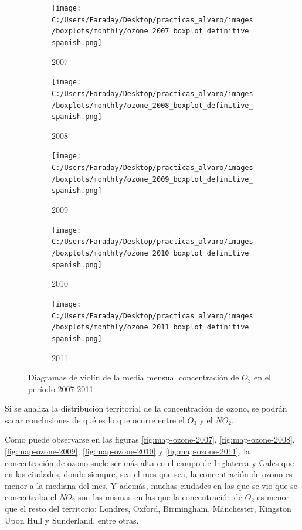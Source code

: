 \documentclass[12pt]{article}
\begin{document}
\begin{figure}[H]
\centering
\begin{subfigure}[H]{0.45\textwidth}
\texttt{[image: C:/Users/Faraday/Desktop/practicas\_alvaro/images/boxplots/monthly/ozone\_2007\_boxplot\_definitive\_spanish.png]}
\captionsetup{labelformat=empty}
\caption{2007}
\label{fig:box-ozone-2007}
\end{subfigure}
%
\begin{subfigure}[H]{0.45\textwidth}
\texttt{[image: C:/Users/Faraday/Desktop/practicas\_alvaro/images/boxplots/monthly/ozone\_2008\_boxplot\_definitive\_spanish.png]}
\captionsetup{labelformat=empty}
\caption{2008}
\label{fig:box-ozone-2008}
\end{subfigure}

\begin{subfigure}[H]{0.45\textwidth}
\texttt{[image: C:/Users/Faraday/Desktop/practicas\_alvaro/images/boxplots/monthly/ozone\_2009\_boxplot\_definitive\_spanish.png]}
\captionsetup{labelformat=empty}
\caption{2009}
\label{fig:box-ozone-2009}
\end{subfigure}
%
\begin{subfigure}[H]{0.45\textwidth}
\texttt{[image: C:/Users/Faraday/Desktop/practicas\_alvaro/images/boxplots/monthly/ozone\_2010\_boxplot\_definitive\_spanish.png]}
\captionsetup{labelformat=empty}
\caption{2010}
\label{fig:box-ozone-2010}
\end{subfigure}

\begin{subfigure}[H]{0.45\textwidth}
\texttt{[image: C:/Users/Faraday/Desktop/practicas\_alvaro/images/boxplots/monthly/ozone\_2011\_boxplot\_definitive\_spanish.png]}
\captionsetup{labelformat=empty}
\caption{2011}
\label{fig:box-ozone-2011}
\end{subfigure}
\caption{Diagramas de violín de la media mensual concentración de $O_{3}$ en el período 2007-2011}
\label{fig:box-ozone-monthly}
\end{figure}

Si se analiza la distribución territorial de la concentración de ozono, se podrán sacar conclusiones de qué es lo que ocurre entre el $O_{3}$ y el $NO_{2}$.

Como puede observarse en las figuras \ref{fig:map-ozone-2007}, \ref{fig:map-ozone-2008}, \ref{fig:map-ozone-2009}, \ref{fig:map-ozone-2010} y \ref{fig:map-ozone-2011}, la concentración de ozono suele ser más alta en el campo de Inglaterra y Gales que en las ciudades, donde siempre, sea el mes que sea, la concentración de ozono es menor a la mediana del mes. Y además, muchas ciudades en las que se vio que se concentraba el $NO_{2}$ son las mismas en las que la concentración de $O_{3}$ es menor que el resto del territorio: Londres, Oxford, Birmingham, Mánchester, Kingston Upon Hull y Sunderland, entre otras.
\end{document}
